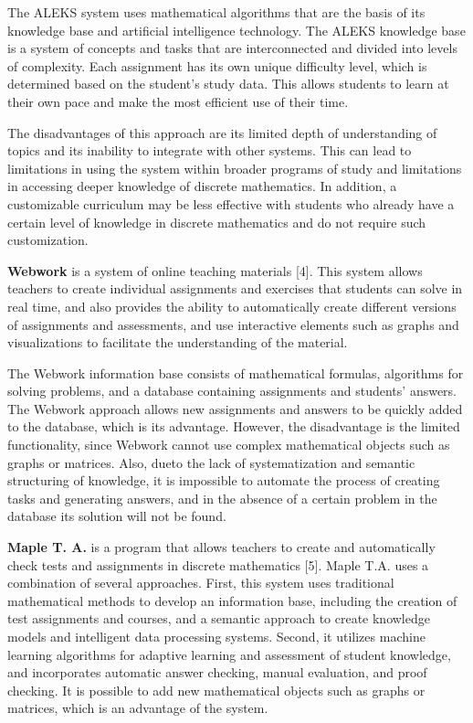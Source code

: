 \documentclass[twocolumn]{scndocument}
\begin{document}
The ALEKS system uses mathematical algorithms that are the basis of its knowledge base and artificial intelligence technology. The ALEKS knowledge base is a system of concepts and tasks that are interconnected and divided into levels of complexity. Each assignment has its own unique difficulty level, which is determined based on the student’s study data. This allows students to learn at their own pace and make the most efficient use of their time.

The disadvantages of this approach are its limited depth of understanding of topics and its inability to integrate with other systems. This can lead to limitations in using the system within broader programs of study and limitations in accessing deeper knowledge of discrete mathematics. In addition, a customizable curriculum may be less effective with students who already have a certain level of knowledge in discrete mathematics and do not require such customization.

\textbf{Webwork} is a system of online teaching materials [4]. This system allows teachers to create individual assignments and exercises that students can solve in real time, and also provides the ability to automatically create different versions of assignments and assessments, and use interactive elements such as graphs and visualizations to facilitate the understanding of the material.

The Webwork information base consists of mathematical formulas, algorithms for solving problems, and a database containing assignments and students’ answers. The Webwork approach allows new assignments and answers to be quickly added to the database, which is its advantage. However, the disadvantage is the limited functionality, since Webwork cannot use complex mathematical objects such as graphs or matrices. Also, dueto the lack of systematization and semantic structuring of knowledge, it is impossible to automate the process of creating tasks and generating answers, and in the absence of a certain problem in the database its solution will not be found.

\textbf{Maple T. A.} is a program that allows teachers to create and automatically check tests and assignments in discrete mathematics [5]. Maple T.A. uses a combination of several approaches. First, this system uses traditional mathematical methods to develop an information base, including the creation of test assignments and courses, and a semantic approach to create knowledge models and intelligent data processing systems. Second, it utilizes machine learning algorithms for adaptive learning and assessment of student knowledge, and incorporates automatic answer checking, manual evaluation, and proof checking. It is possible to add new mathematical objects such as graphs or matrices, which is an advantage of the system.
\end{document}
